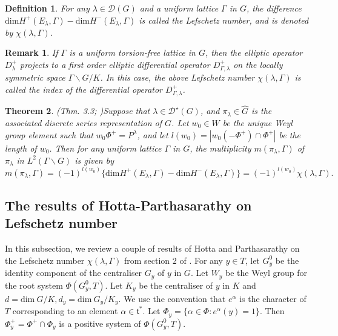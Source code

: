 \documentclass[11 pt]{amsart}
\newtheorem{theorem}{Theorem}[section]
\newtheorem{cor}[theorem]{{\bf Corollary}}
\theoremstyle{definition}
\newtheorem{definition}[theorem]{Definition}
\newtheorem{remark}{Remark}[section]
\numberwithin{equation}{section}
\begin{document}

\begin{definition}\label{lefschetzdef}
\textit{For any $\lambda \in \mathcal{D}(G)$ and a uniform lattice $\Gamma$ in $G$, the difference $\text{dim} H^+(E_{\lambda} , \Gamma) - \text{dim} H^-(E_{\lambda} , \Gamma)$ is called the Lefschetz number, and is denoted by $\chi(\lambda , \Gamma)$.}
\end{definition}

\begin{remark}
\textit{If $\Gamma$ is a uniform torsion-free lattice in $G$, then the elliptic operator $D^+_{\lambda}$ projects to a first order elliptic differential operator $D_{\Gamma, \lambda}^+$ on the locally symmetric space $\Gamma \backslash G / K$. In this case, the above Lefschetz number $\chi(\lambda , \Gamma)$ is called the index of the differential operator $D_{\Gamma, \lambda}^+$.}\end{remark}


\begin{theorem}(Thm. 3.3; \cite{FW1})\label{thm4}
\textit{Suppose that $\lambda \in \mathcal{D}^{\star}(G)$, and $\pi_{\lambda} \in \widehat{G}$ is the associated discrete series representation of $G$. Let $w_0 \in W$ be the unique Weyl group element such that $w_0 \Phi^+ = P^{\lambda}$, and let $l(w_0) = | w_0 (- \Phi^+) \cap \Phi^+ |$ be the length of $w_0$. Then for any uniform lattice $\Gamma$ in $G$, the multiplicity $m(\pi_{\lambda}, \Gamma)$ of $\pi_{\lambda}$ in $L^2(\Gamma \backslash G)$ is given by 
$$ m(\pi_{\lambda}, \Gamma) = (-1)^{l(w_0)} \{ \text{dim} H^+(E_{\lambda} , \Gamma) - \text{dim} H^-(E_{\lambda} , \Gamma) \} = (-1)^{l(w_0)} \chi(\lambda , \Gamma).$$}
    

\end{theorem}

\subsection{The results of Hotta-Parthasarathy on Lefschetz number}\label{sec-2-3}

In this subsection, we review a couple of results of Hotta and Parthasarathy on the Lefschetz number $\chi(\lambda , \Gamma)$ from section 2 of \cite{HP}. For any $y \in T$, let $G_y^0$ be the identity component of the centraliser $G_y$ of $y$ in $G$. Let $W_y$ be the Weyl group for the root system $\Phi(G_y^0, T)$. Let $K_y$ be the centraliser of $y$ in $K$ and $d = \text{dim}\ {G/K}, d_{y}=\text{dim}\ G_y / K_y$. We use the convention that $e^{\alpha}$ is the character of $T$ corresponding to an element $\alpha \in \mathfrak{t}^*$. Let $\Phi_y = \{ \alpha \in \Phi : e^{\alpha}(y)=1\}$. Then $\Phi_y^+=\Phi^+ \cap \Phi_y$ is a positive system of $\Phi(G_y^0, T)$.  
\end{document}
